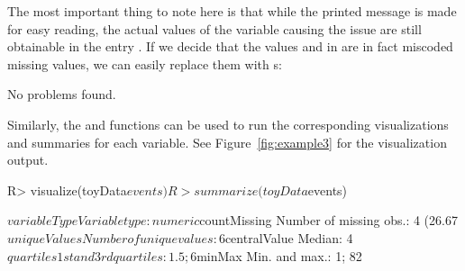 \documentclass[article,shortnames]{jss}
\begin{document}
\begin{Schunk}
\end{Schunk}

The most important thing to note here is that while the printed
message is made for easy reading, the actual values of the variable
causing the issue are still obtainable in the entry
. If we decide that the values 
and  in  are in fact miscoded missing values, we can
easily replace them with s:

\begin{Schunk}
\begin{Soutput}
No problems found.
\end{Soutput}
\end{Schunk}

Similarly, the  and  functions can be
used to run the corresponding visualizations and summaries for each
variable. See Figure~\ref{fig:example3} for the visualization output.


\begin{Schunk}
\begin{Sinput}
R> visualize(toyData$events)
R> summarize(toyData$events)
\end{Sinput}
\begin{Soutput}
$variableType
Variable type: numeric
$countMissing
Number of missing obs.: 4 (26.67 %
$uniqueValues
Number of unique values: 6
$centralValue
Median: 4
$quartiles
1st and 3rd quartiles: 1.5; 6
$minMax
Min. and max.: 1; 82
\end{Soutput}
\end{Schunk}
\end{document}
